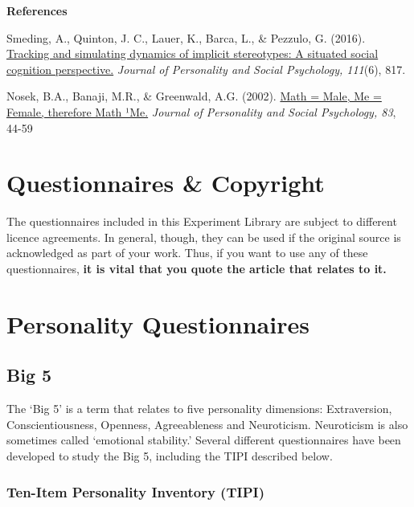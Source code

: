 \documentclass[
]{book}
\begin{document}
\textbf{References}

Smeding, A., Quinton, J. C., Lauer, K., Barca, L., \& Pezzulo, G. (2016). \href{https://www.researchgate.net/profile/Jean-Charles_Quinton/publication/308341625_Tracking_and_Simulating_Dynamics_of_Implicit_Stereotypes_A_Situated_Social_Cognition_Perspective/links/581b4c3508aea429b28fc0d0/Tracking-and-Simulating-Dynamics-of-Implicit-Stereotypes-A-Situated-Social-Cognition-Perspective.pdf}{Tracking and simulating dynamics of implicit stereotypes: A situated social cognition perspective.} \emph{Journal of Personality and Social Psychology, 111}(6), 817.

Nosek, B.A., Banaji, M.R., \& Greenwald, A.G. (2002). \href{https://psyarxiv.com/y2g6s}{Math = Male, Me = Female, therefore Math ¹Me.} \emph{Journal of Personality and Social Psychology, 83}, 44-59

\hypertarget{questionnaires-copyright}{%
\chapter{Questionnaires \& Copyright}\label{questionnaires-copyright}}

The questionnaires included in this Experiment Library are subject to different licence agreements. In general, though, they can be used if the original source is acknowledged as part of your work. Thus, if you want to use any of these questionnaires, \textbf{it is vital that you quote the article that relates to it.}

\hypertarget{personality-questionnaires}{%
\chapter{Personality Questionnaires}\label{personality-questionnaires}}

\hypertarget{big-5}{%
\section{Big 5}\label{big-5}}

The `Big 5' is a term that relates to five personality dimensions: Extraversion,
Conscientiousness, Openness, Agreeableness and Neuroticism. Neuroticism is also sometimes called `emotional stability.' Several different questionnaires have been developed to study the Big 5, including the TIPI described below.

\hypertarget{ten-item-personality-inventory-tipi}{%
\subsection{Ten-Item Personality Inventory (TIPI)}\label{ten-item-personality-inventory-tipi}}
\end{document}
